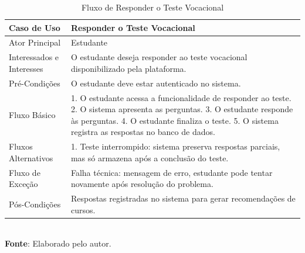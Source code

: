 \begin{table}[h!]
\centering
\caption{Fluxo de Responder o Teste Vocacional}
\begin{tabular}{|m{4cm}|m{11cm}|}
\hline
\textbf{Caso de Uso}   & \textbf{Responder o Teste Vocacional} \\
\hline
Ator Principal & Estudante\\
\hline
Interessados e Interesses & O estudante deseja responder ao teste vocacional disponibilizado pela plataforma. \\
\hline
Pré-Condições & 

O estudante deve estar autenticado no sistema. \\
\hline
Fluxo Básico & 
1. O estudante acessa a funcionalidade de responder ao teste.
2. O sistema apresenta as perguntas.
3. O estudante responde às perguntas.
4. O estudante finaliza o teste.
5. O sistema registra as respostas no banco de dados.
\\
\hline
Fluxos Alternativos & 

1. Teste interrompido: sistema preserva respostas parciais, mas só armazena após a conclusão do teste.
\\
\hline
Fluxo de Exceção & Falha técnica: mensagem de erro, estudante pode tentar novamente após resolução do problema. \\
\hline
Pós-Condições & Respostas registradas no sistema para gerar recomendações de cursos.\\
\hline
\end{tabular}
\label{table:casos-de-uso}
\\[1ex]
\footnotesize \textbf{Fonte}: Elaborado pelo autor.
\end{table}

